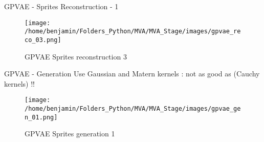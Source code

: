 \begin{frame}{GPVAE - Sprites Reconstruction - 1}
\begin{figure}[H]
    \centering
    \texttt{[image: /home/benjamin/Folders\_Python/MVA/MVA\_Stage/images/gpvae\_reco\_03.png]}
    \caption{GPVAE Sprites reconstruction 3}
    \label{fig:GPVAE Sprites reconstruction 3}
\end{figure}
\end{frame}

\begin{frame}{GPVAE - Generation}
    Use Gaussian and Matern kernels : not as good as \cite{li_disentangled_2018} (Cauchy kernels) !!
    \begin{figure}[H]
        \centering
        \texttt{[image: /home/benjamin/Folders\_Python/MVA/MVA\_Stage/images/gpvae\_gen\_01.png]}
        \caption{GPVAE Sprites generation 1}
        \label{fig:GPVAE Sprites generation 1}
    \end{figure}
\end{frame}
